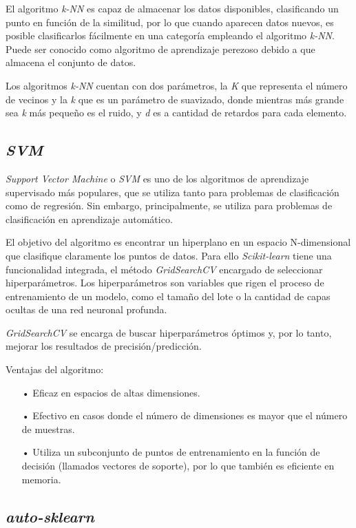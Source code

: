 El algoritmo \textit{k-NN} es capaz de almacenar los datos disponibles, clasificando un punto en función de la similitud, por lo que cuando aparecen datos nuevos, es posible clasificarlos fácilmente en una categoría empleando el algoritmo \textit{k-NN}. Puede ser conocido como algoritmo de aprendizaje perezoso debido a que almacena el conjunto de datos. 

Los algoritmos \textit{k-NN} cuentan con dos parámetros, la \emph{K} que representa el número de vecinos y la \textit{k} que es un parámetro de suavizado, donde mientras más grande sea \textit{k} más pequeño es el ruido, y \textit{d} es a cantidad de retardos para cada elemento. 

\subsection{\textit{SVM}}

\textit{Support Vector Machine} o \textit{SVM} es uno de los algoritmos de aprendizaje supervisado más populares, que se utiliza tanto para problemas de clasificación como de regresión. Sin embargo, principalmente, se utiliza para problemas de clasificación en aprendizaje automático.

El objetivo del algoritmo es encontrar un hiperplano en un espacio N-dimensional que clasifique claramente los puntos de datos. Para ello \textit{Scikit-learn} tiene una funcionalidad integrada, el método \textit{GridSearchCV} encargado de seleccionar hiperparámetros. Los hiperparámetros son variables que rigen el proceso de entrenamiento de un modelo, como el tamaño del lote o la cantidad de capas ocultas de una red neuronal profunda. 

\textit{GridSearchCV} se encarga de buscar hiperparámetros óptimos y, por lo tanto, mejorar los resultados de precisión/predicción. \cite{BibEntry2022Aug}

Ventajas del algoritmo:
\begin{itemize}
	\item[•]Eficaz en espacios de altas dimensiones.
	\item[•]Efectivo en casos donde el número de dimensiones es mayor que el número de muestras.
	\item[•]Utiliza un subconjunto de puntos de entrenamiento en la función de decisión (llamados vectores de soporte), por lo que también es eficiente en memoria.
\end{itemize}

\subsection{\textit{auto-sklearn}}

